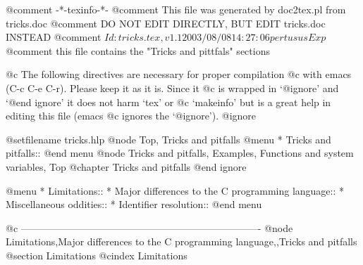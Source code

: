 @comment -*-texinfo-*-
@comment This file was generated by doc2tex.pl from tricks.doc
@comment DO NOT EDIT DIRECTLY, BUT EDIT tricks.doc INSTEAD
@comment $Id: tricks.tex,v 1.1 2003/08/08 14:27:06 pertusus Exp $
@comment this file contains the "Tricks and pittfals" sections

@c The following directives are necessary for proper compilation
@c with emacs (C-c C-e C-r).  Please keep it as it is.  Since it
@c is wrapped in `@ignore' and `@end ignore' it does not harm `tex' or
@c `makeinfo' but is a great help in editing this file (emacs
@c ignores the `@ignore').
@ignore

@setfilename tricks.hlp
@node Top, Tricks and pitfalls
@menu
* Tricks and pitfalls::
@end menu
@node Tricks and pitfalls, Examples, Functions and system variables, Top
@chapter Tricks and pitfalls
@end ignore

@menu
* Limitations::
* Major differences to the C programming language::
* Miscellaneous oddities::
* Identifier resolution::
@end menu

@c -------------------------------------------------------------------------
@node Limitations,Major differences to the C programming language,,Tricks and pitfalls
@section Limitations
@cindex Limitations

